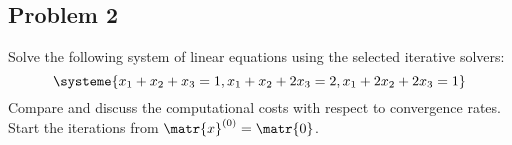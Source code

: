 \subsection{Problem 2}%
\label{sec:problem_2}
Solve the following system of linear equations using the selected iterative solvers:
\begin{equation*}
  \systeme{x_1+x_2+x_3=1,x_1+x_2+2x_3=2,x_1+2x_2+2x_3=1}
\end{equation*}
Compare and discuss the computational costs with respect to convergence rates.
Start the iterations from $\matr{x}^{(0)}=\matr{0}$.
